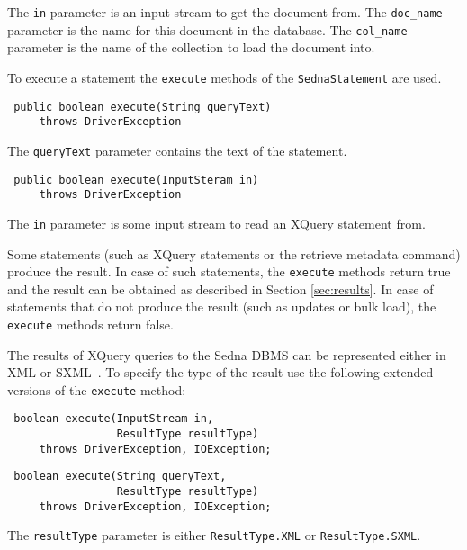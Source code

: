 \documentclass[a4paper,12pt]{article}
\begin{document}
The \verb!in! parameter is an input stream to get the document from. The
\verb!doc_name! parameter is the name for this document in the database. The
\verb!col_name! parameter is the name of the collection to load the document
into.

To execute a statement the \verb!execute! methods of the \verb!SednaStatement!
are used.

\begin{verbatim}
 public boolean execute(String queryText)
     throws DriverException
\end{verbatim}

The \verb!queryText! parameter contains the text of the statement.

\begin{verbatim}
 public boolean execute(InputSteram in)
     throws DriverException
\end{verbatim}

The \verb!in! parameter is some input stream to read an XQuery statement from.

Some statements (such as XQuery statements or the retrieve metadata command)
produce the result. In case of such statements, the \verb!execute! methods
return true and the result can be obtained as described in Section
\ref{sec:results}. In case of statements that do not produce the result (such as
updates or bulk load), the \verb!execute! methods return false.

The results of XQuery queries to the Sedna DBMS can be represented either in XML
or SXML~\cite{paper:sxml}. To specify the type of the result use the following 
extended versions of the \verb!execute! method:

\begin{verbatim}
 boolean execute(InputStream in, 
                 ResultType resultType)
     throws DriverException, IOException;
\end{verbatim}

\begin{verbatim}
 boolean execute(String queryText, 
                 ResultType resultType)
     throws DriverException, IOException;
\end{verbatim}

The \verb!resultType! parameter is either \verb!ResultType.XML! or
\verb!ResultType.SXML!.


\end{document}
